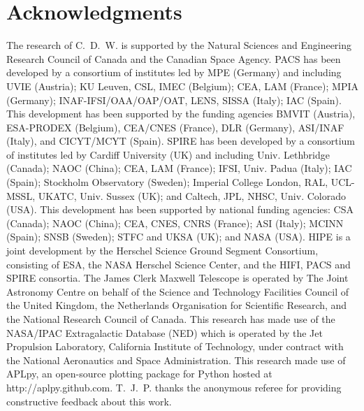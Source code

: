 \documentclass[useAMS,usenatbib,usegraphicx]{mn2e}
\begin{document}
\section*{Acknowledgments}
The research of C.~D.~W. is supported by the Natural Sciences and Engineering Research Council of Canada and the Canadian Space Agency.  PACS has been developed by a consortium of institutes led by MPE (Germany) and including UVIE (Austria); KU Leuven, CSL, IMEC (Belgium); CEA, LAM (France); MPIA (Germany); INAF-IFSI/OAA/OAP/OAT, LENS, SISSA (Italy); IAC (Spain). This development has been supported by the funding agencies BMVIT (Austria), ESA-PRODEX (Belgium), CEA/CNES (France), DLR (Germany), ASI/INAF (Italy), and CICYT/MCYT (Spain).  SPIRE has been developed by a consortium of institutes led by Cardiff University (UK) and including Univ. Lethbridge (Canada); NAOC (China); CEA, LAM (France); IFSI, Univ. Padua (Italy); IAC (Spain); Stockholm Observatory (Sweden); Imperial College London, RAL, UCL-MSSL, UKATC, Univ. Sussex (UK); and Caltech, JPL, NHSC, Univ. Colorado (USA). This development has been supported by national funding agencies: CSA (Canada); NAOC (China); CEA, CNES, CNRS (France); ASI (Italy); MCINN (Spain); SNSB (Sweden); STFC and UKSA (UK); and NASA (USA).  HIPE is a joint development by the Herschel Science Ground Segment Consortium, consisting of ESA, the NASA Herschel Science Center, and the HIFI, PACS and SPIRE consortia.  The James Clerk Maxwell Telescope is operated by The Joint Astronomy Centre on behalf of the Science and Technology Facilities Council of the United Kingdom, the Netherlands Organisation for Scientific Research, and the National Research Council of Canada. This research has made use of the NASA/IPAC Extragalactic Database (NED) which is operated by the Jet Propulsion Laboratory, California Institute of Technology, under contract with the National Aeronautics and Space Administration.  This research made use of APLpy, an open-source plotting package for Python hosted at http://aplpy.github.com.  T.~J.~P. thanks the anonymous referee for providing constructive feedback about this work.
\end{document}

